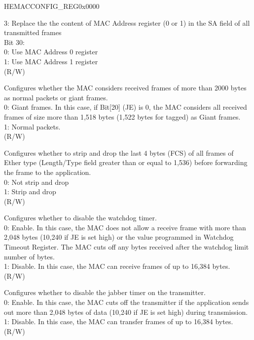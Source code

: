 \begin{register}{H}{EMACCONFIG\_REG}{0x0000}
\begin{regdesc}
\begin{reglist}
3: Replace the the content of MAC Address register (0 or 1) in the SA field of all transmitted frames\\
Bit 30:\\
0: Use MAC Address 0 register\\
1: Use MAC Address 1 register\\
(R/W)
\item [ASS2KP] Configures whether the MAC considers received frames of more than 2000 bytes as normal packets or giant frames.\\
0: Giant frames. In this case, if Bit[20] (JE) is 0, the MAC considers all received frames of size more than 1,518 bytes (1,522 bytes for tagged) as Giant frames.\\
1: Normal packets.\\
(R/W)
\item [EMACCRC\_STRIP] Configures whether to strip and drop the last 4 bytes (FCS) of all frames of Ether type (Length/Type field greater than or equal to 1,536) before forwarding the frame to the application.\\
0: Not strip and drop\\
1: Strip and drop\\(R/W)
\item [EMACWATCHDOG] Configures whether to disable the watchdog timer.\\
0: Enable. In this case, the MAC does not allow a receive frame with more than 2,048 bytes (10,240 if JE is set high) or the value programmed in Watchdog Timeout Register. The MAC cuts off any bytes received after the watchdog limit number of bytes.\\
1: Disable. In this case, the MAC can receive frames of up to 16,384 bytes. \\(R/W)
\item [EMACJABBER] Configures whether to disable the jabber timer on the transmitter.\\
0: Enable. In this case, the MAC cuts off the transmitter if the application sends out more than 2,048 bytes of data (10,240 if JE is set high) during transmission.\\
1: Disable. In this case, the MAC can transfer frames of up to 16,384 bytes.\\ (R/W)

\item[Continued on the next page...]
\end{reglist}\end{regdesc}
\end{register}

